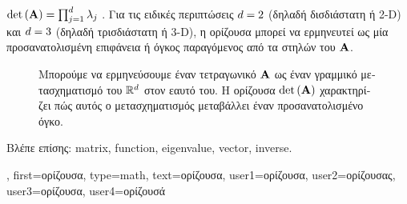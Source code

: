 {{		$\det\,({\bf A}) = \prod_{j=1}^{d} \lambda_{j}$ \cite{HornMatAnalysis}.
    		\foreignlanguage{greek}{Για τις ειδικές περιπτώσεις $d=2$ (δηλαδή δισδιάστατη ή 2-D) και $d=3$ 
		(δηλαδή τρισδιάστατη ή 3-D), η ορίζουσα μπορεί να ερμηνευτεί ως μία προσανατολισμένη επιφάνεια ή όγκος παραγόμενος από
		τα}  \foreignlanguage{greek}{στηλών του} ${\bf A}$.
    		\begin{figure}[H]
    			\begin{center}
			\end{center}
			{
			\caption{\foreignlanguage{greek}{Μπορούμε να ερμηνεύσουμε έναν τετραγωνικό}  ${\bf A}$ 
				\foreignlanguage{greek}{ως έναν γραμμικό μετασχηματισμό του $\mathbb{R}^{d}$ στον εαυτό του.
				Η ορίζουσα $\det\,({\bf A})$ χαρακτηρίζει πώς αυτός ο μετασχηματισμός μεταβάλλει έναν προσανατολισμένο όγκο.}
				\label{fig_det_dict}} }
		\end{figure}
		\foreignlanguage{greek}{Βλέπε επίσης:} \gls{matrix}, \gls{function}, \gls{eigenvalue}, \gls{vector}, \gls{inverse}.},
	first={\foreignlanguage{greek}{ορίζουσα}},
	type=math,
	text={\foreignlanguage{greek}{ορίζουσα}},
	user1={\foreignlanguage{greek}{ορίζουσα}}, %
	user2={\foreignlanguage{greek}{ορίζουσας}}, %
	user3={\foreignlanguage{greek}{ορίζουσα}}, %
	user4={\foreignlanguage{greek}{ορίζουσά}} %
}

